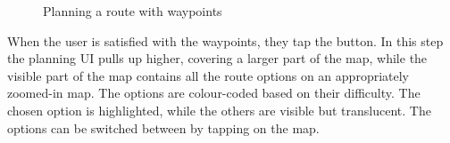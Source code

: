 \begin{figure}[h!]
    \centering
    \hfill
    \hfill
    \caption{Planning a route with waypoints}
    \label{fig:plan-waypoints}
\end{figure}

When the user is satisfied with the waypoints, they tap the  button.
In this step the planning UI pulls up higher, covering a larger part of the map, while the visible part of the map contains all the route options on an appropriately zoomed-in map.
The options are colour-coded based on their difficulty.
The chosen option is highlighted, while the others are visible but translucent.
The options can be switched between by tapping on the map.

